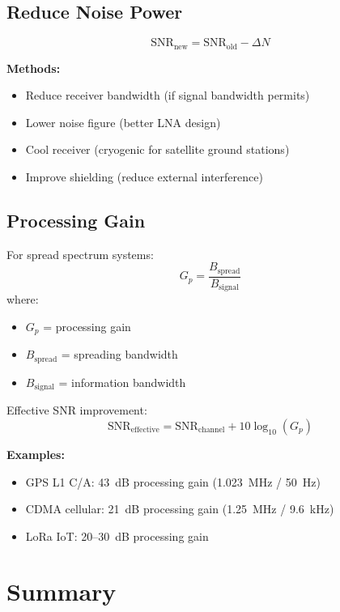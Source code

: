 \subsection{Reduce Noise Power}

\begin{equation}
\mathrm{SNR_{new}} = \mathrm{SNR_{old}} - \Delta N
\end{equation}

\textbf{Methods:}
\begin{itemize}
\item Reduce receiver bandwidth (if signal bandwidth permits)
\item Lower noise figure (better LNA design)
\item Cool receiver (cryogenic for satellite ground stations)
\item Improve shielding (reduce external interference)
\end{itemize}

\subsection{Processing Gain}

For spread spectrum systems:
\begin{equation}
G_p = \frac{B_{\mathrm{spread}}}{B_{\mathrm{signal}}}
\end{equation}
where:
\begin{itemize}
\item $G_p$ = processing gain
\item $B_{\mathrm{spread}}$ = spreading bandwidth
\item $B_{\mathrm{signal}}$ = information bandwidth
\end{itemize}

Effective SNR improvement:
\begin{equation}
\mathrm{SNR_{effective}} = \mathrm{SNR_{channel}} + 10\log_{10}(G_p)
\end{equation}

\textbf{Examples:}
\begin{itemize}
\item GPS L1 C/A: 43~dB processing gain (1.023~MHz / 50~Hz)
\item CDMA cellular: 21~dB processing gain (1.25~MHz / 9.6~kHz)
\item LoRa IoT: 20--30~dB processing gain
\end{itemize}

\section{Summary}

